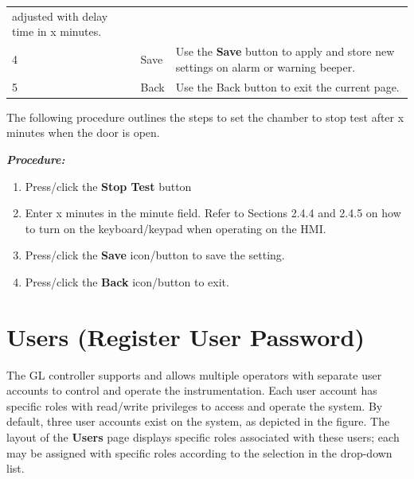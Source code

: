 \begin{longtable}[]{@{}lll@{}}
\begin{minipage}[t]{0.46\columnwidth}
adjusted with delay time in x minutes.\strut
\end{minipage}\tabularnewline
\begin{minipage}[t]{0.09\columnwidth}\raggedright
4\strut
\end{minipage} & \begin{minipage}[t]{0.37\columnwidth}\raggedright
Save\strut
\end{minipage} & \begin{minipage}[t]{0.46\columnwidth}\raggedright
Use the \textbf{Save} button to apply and store new settings on alarm or
warning beeper.\strut
\end{minipage}\tabularnewline
\begin{minipage}[t]{0.09\columnwidth}\raggedright
5\strut
\end{minipage} & \begin{minipage}[t]{0.37\columnwidth}\raggedright
Back\strut
\end{minipage} & \begin{minipage}[t]{0.46\columnwidth}\raggedright
Use the Back button to exit the current page.\strut
\end{minipage}\tabularnewline
\bottomrule
\end{longtable}

The following procedure outlines the steps to set the chamber to stop
test after x minutes when the door is open.

\textbf{\emph{Procedure:}}

\begin{enumerate}
\def\labelenumi{\arabic{enumi}.}
\item
  Press/click the \textbf{Stop Test} button
\item
  Enter x minutes in the minute field. Refer to Sections 2.4.4 and 2.4.5
  on how to turn on the keyboard/keypad when operating on the HMI.
\item
  Press/click the \textbf{Save} icon/button to save the setting.
\item
  Press/click the \textbf{Back} icon/button to exit.
\end{enumerate}

\pagebreak 

\section{Users (Register User
Password)}

The GL controller supports and allows multiple operators with separate
user accounts to control and operate the instrumentation. Each user
account has specific roles with read/write privileges to access and
operate the system. By default, three user accounts exist on the system,
as depicted in the figure. The layout of the \textbf{Users} page
displays specific roles associated with these users; each may be
assigned with specific roles according to the selection in the drop-down
list.


